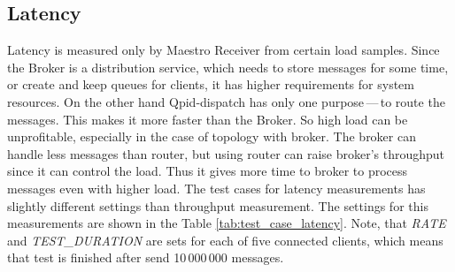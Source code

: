 \subsection{Latency}
\label{Latency}
Latency is measured only by Maestro Receiver from certain load samples. Since the Broker is a distribution service, which needs to store messages for some time, or create and keep queues for clients, it has higher requirements for system resources. On the other hand Qpid-dispatch has only one purpose\,---\,to route the messages. This makes it more faster than the Broker. So high load can be unprofitable, especially in the case of topology with broker. The broker can handle less messages than router, but using router can raise broker's throughput since it can control the load. Thus it gives more time to broker to process messages even with higher load. The test cases for latency measurements has slightly different settings than throughput measurement. The settings for this measurements are shown in the Table \ref{tab:test_case_latency}. Note, that \emph{RATE} and \emph{TEST\_DURATION} are sets for each of five connected clients, which means that test is finished after send 10\,000\,000 messages.

